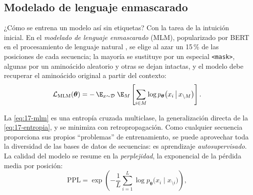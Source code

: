 \subsection{Modelado de lenguaje enmascarado}

¿Cómo se entrena un modelo así sin etiquetas? Con la tarea de la intuición inicial. En el \emph{modelado de lenguaje enmascarado} (MLM), popularizado por BERT en el procesamiento de lenguaje natural \parencite{c17-devlin2019}, se elige al azar un 15\,\% de las posiciones de cada secuencia; la mayoría se sustituye por un  especial \texttt{\textless{}mask\textgreater{}}, algunas por un aminoácido aleatorio y otras se dejan intactas, y el modelo debe recuperar el aminoácido original a partir del contexto:
\begin{equation}\label{eq:17-mlm}
\mathcal{L}_{\mathrm{MLM}}(\boldsymbol\theta) = -\,\E_{x\sim\mathcal{D}}\;\E_{M}\left[\sum_{i\in M}\log p_{\boldsymbol\theta}\big(x_i\,\big|\,x_{\setminus M}\big)\right].
\end{equation}

\begin{simbolos}
\end{simbolos}

La \cref{eq:17-mlm} es una entropía cruzada multiclase, la generalización directa de la \cref{eq:17-entropia}, y se minimiza con retropropagación. Como cualquier secuencia proporciona sus propios ``problemas'' de entrenamiento, se puede aprovechar toda la diversidad de las bases de datos de secuencias: es aprendizaje \emph{autosupervisado}. La calidad del modelo se resume en la \emph{perplejidad}, la exponencial de la pérdida media por posición:
\begin{equation}\label{eq:17-perplejidad}
\mathrm{PPL} = \exp\!\left(-\frac{1}{L}\sum_{i=1}^{L}\log p_{\boldsymbol\theta}\big(x_i\mid x_{\setminus i}\big)\right),
\end{equation}

\begin{simbolos}
\end{simbolos}

